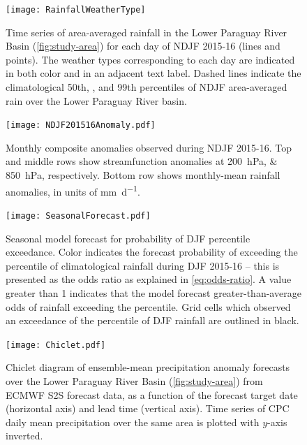 \documentclass[twocol]{ametsoc}
\begin{document}
\begin{figure}
	\noindent\texttt{[image: RainfallWeatherType]}
	\caption{
		Time series of area-averaged rainfall in the Lower Paraguay River Basin (\cref{fig:study-area}) for each day of NDJF  2015-16 (lines and points).
        The weather types corresponding to each day are indicated in both color and in an adjacent text label.
		Dashed lines indicate the climatological 50th, , and 99th percentiles of NDJF area-averaged rain over the Lower Paraguay River basin.
	}
  \label{fig:rain-wt}
\end{figure}


\begin{figure}
	\noindent\texttt{[image: NDJF201516Anomaly.pdf]}
	\caption{
    	Monthly composite anomalies observed during NDJF 2015-16.
    	Top and middle rows show streamfunction anomalies at \SIlist{200;850}{\hecto\pascal}, respectively.
      Bottom row shows monthly-mean rainfall anomalies, in units of \si{\milli\meter\per\day}.
	}
  \label{fig:anomalies}
\end{figure}

\begin{figure}
	\noindent\texttt{[image: SeasonalForecast.pdf]}
	\caption{
	Seasonal model forecast for probability of DJF  percentile exceedance.
	Color indicates the forecast probability of exceeding the  percentile of climatological rainfall during DJF 2015-16 -- this is presented as the odds ratio as explained in \cref{eq:odds-ratio}.
	A value greater than 1 indicates that the model forecast greater-than-average odds of rainfall exceeding the  percentile.
	Grid cells which observed an exceedance of the  percentile of DJF rainfall are outlined in black.
	}
  \label{fig:seas-prob-fcst}
\end{figure}

\begin{figure}
	\noindent\texttt{[image: Chiclet.pdf]}
	\caption{
    Chiclet diagram \citep{Carbin:2016fx} of ensemble-mean precipitation anomaly forecasts over the Lower Paraguay River Basin (\cref{fig:study-area}) from ECMWF S2S forecast data, as a function of the forecast target date (horizontal axis) and lead time (vertical axis). Time series of CPC daily mean precipitation over the same area is plotted with $y$-axis inverted.
	}
  \label{fig:chiclet}
\end{figure}
\end{document}

